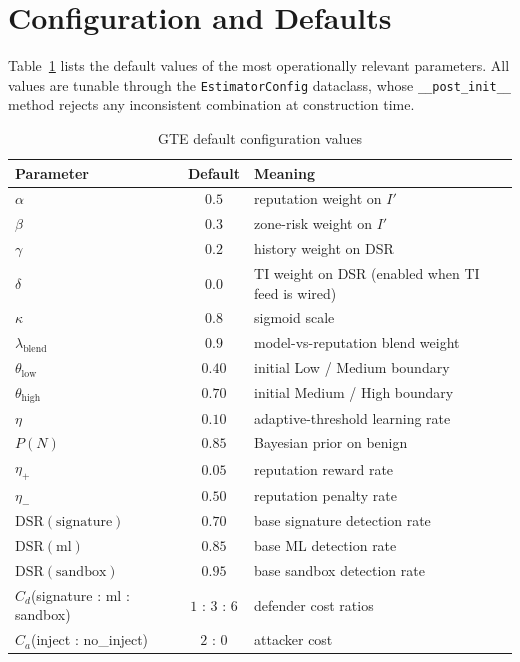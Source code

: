 \documentclass[12pt, a4paper]{report}
\begin{document}
\section{Configuration and Defaults}
\label{sec:gte-config}

Table~\ref{tab:gte-defaults} lists the default values of the most
operationally relevant parameters. All values are tunable through the
\texttt{EstimatorConfig} dataclass, whose \texttt{\_\_post\_init\_\_}
method rejects any inconsistent combination at construction time.

\begin{table}[H]
\centering
\caption{GTE default configuration values}
\label{tab:gte-defaults}
\begin{tabular}{|p{5.2cm}|c|p{5.8cm}|}
\hline
\textbf{Parameter} & \textbf{Default} & \textbf{Meaning} \\
\hline
$\alpha$ & $0.5$ & reputation weight on $I'$ \\
\hline
$\beta$ & $0.3$ & zone-risk weight on $I'$ \\
\hline
$\gamma$ & $0.2$ & history weight on DSR \\
\hline
$\delta$ & $0.0$ & TI weight on DSR (enabled when TI feed is wired) \\
\hline
$\kappa$ & $0.8$ & sigmoid scale \\
\hline
$\lambda_{\text{blend}}$ & $0.9$ & model-vs-reputation blend weight \\
\hline
$\theta_{\text{low}}$ & $0.40$ & initial Low / Medium boundary \\
\hline
$\theta_{\text{high}}$ & $0.70$ & initial Medium / High boundary \\
\hline
$\eta$ & $0.10$ & adaptive-threshold learning rate \\
\hline
$P(N)$ & $0.85$ & Bayesian prior on benign \\
\hline
$\eta_+$ & $0.05$ & reputation reward rate \\
\hline
$\eta_-$ & $0.50$ & reputation penalty rate \\
\hline
$\mathrm{DSR}(\text{signature})$ & $0.70$ & base signature detection rate \\
\hline
$\mathrm{DSR}(\text{ml})$ & $0.85$ & base ML detection rate \\
\hline
$\mathrm{DSR}(\text{sandbox})$ & $0.95$ & base sandbox detection rate \\
\hline
$C_d$(signature : ml : sandbox) & $1$ : $3$ : $6$ & defender cost ratios \\
\hline
$C_a$(inject : no\_inject) & $2$ : $0$ & attacker cost \\
\hline
\end{tabular}
\end{table}
\end{document}
